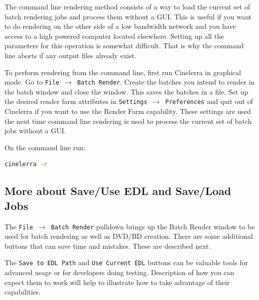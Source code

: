 The command line rendering method consists of a way to load the current set of batch rendering jobs and process them without a GUI. This is useful if you want to do rendering on the other side of a low bandwidth network and you have access to a high powered computer located elsewhere. Setting up all the parameters for this operation is somewhat difficult. That is why the command line aborts if any output files already exist.

To perform rendering from the command line, first run Cinelerra in graphical mode. Go to \texttt{File $\rightarrow$ Batch Render}. Create the batches you intend to render in the batch window and close the window. This saves the batches in a file. Set up the desired render farm attributes in \texttt{Settings $\rightarrow$ Preferences} and quit out of Cinelerra if you want to use the Render Farm capability.  These settings are used the next time command line rendering is used to process the current set of batch jobs without a GUI.

On the command line run:

\begin{lstlisting}[language=bash]
cinelerra -r
\end{lstlisting}

\subsection{More about Save/Use EDL and Save/Load Jobs}%
\label{sub:more_save_use_edl_jobs}

The \texttt{File $\rightarrow$ Batch Render} pulldown brings up the Batch Render window to be used for batch rendering as well as DVD/BD creation.  There are some additional buttons that can save time and mistakes.  These are described next.

The \texttt{Save to EDL Path} and \texttt{Use Current EDL} buttons can be valuable tools for advanced usage or for developers doing testing.  Description of how you can expect them to work will help to illustrate how to take advantage of their capabilities.

